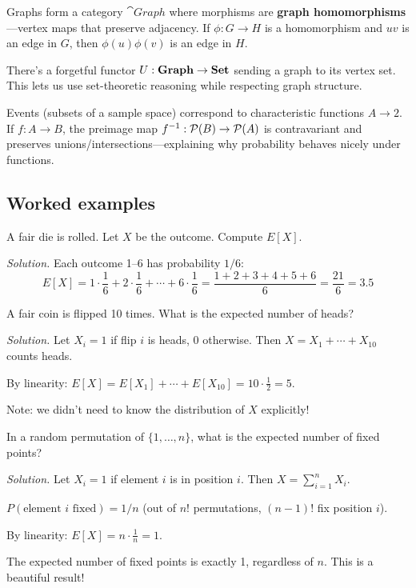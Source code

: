 \begin{goingdeeper}
Graphs form a category $\cat{Graph}$ where morphisms are \textbf{graph homomorphisms}---vertex maps that preserve adjacency. If $\phi: G \to H$ is a homomorphism and $uv$ is an edge in $G$, then $\phi(u)\phi(v)$ is an edge in $H$.

There's a forgetful functor $U: \mathbf{Graph} \to \mathbf{Set}$ sending a graph to its vertex set. This lets us use set-theoretic reasoning while respecting graph structure.

Events (subsets of a sample space) correspond to characteristic functions $A \to 2$. If $f: A \to B$, the preimage map $f^{-1}: \mathcal{P}(B) \to \mathcal{P}(A)$ is contravariant and preserves unions/intersections---explaining why probability behaves nicely under functions.
\end{goingdeeper}

\subsection*{Worked examples}

\begin{example}
A fair die is rolled. Let $X$ be the outcome. Compute $E[X]$.

\emph{Solution.} Each outcome 1--6 has probability $1/6$:
\[
E[X] = 1 \cdot \frac{1}{6} + 2 \cdot \frac{1}{6} + \cdots + 6 \cdot \frac{1}{6} = \frac{1+2+3+4+5+6}{6} = \frac{21}{6} = 3.5
\]
\end{example}

\begin{example}
A fair coin is flipped 10 times. What is the expected number of heads?

\emph{Solution.} Let $X_i = 1$ if flip $i$ is heads, 0 otherwise. Then $X = X_1 + \cdots + X_{10}$ counts heads.

By linearity: $E[X] = E[X_1] + \cdots + E[X_{10}] = 10 \cdot \frac{1}{2} = 5$.

Note: we didn't need to know the distribution of $X$ explicitly!
\end{example}

\begin{example}
In a random permutation of $\{1, \ldots, n\}$, what is the expected number of fixed points?

\emph{Solution.} Let $X_i = 1$ if element $i$ is in position $i$. Then $X = \sum_{i=1}^n X_i$.

$P(\text{element } i \text{ fixed}) = 1/n$ (out of $n!$ permutations, $(n-1)!$ fix position $i$).

By linearity: $E[X] = n \cdot \frac{1}{n} = 1$.

The expected number of fixed points is exactly 1, regardless of $n$. This is a beautiful result!
\end{example}

